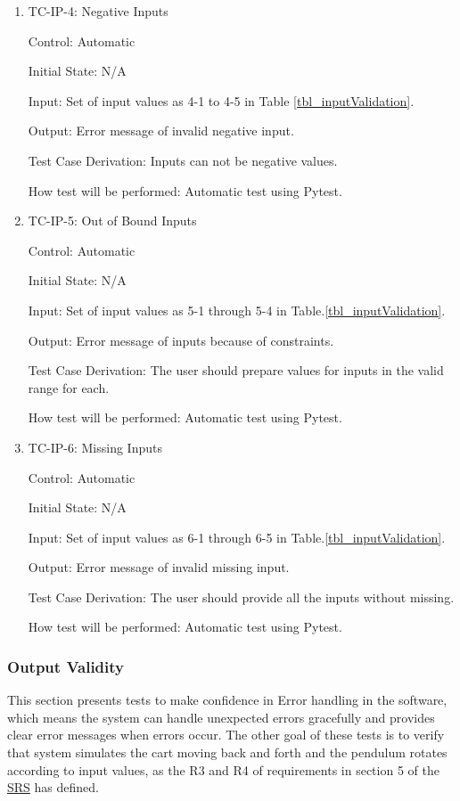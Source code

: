 \documentclass[12pt, titlepage]{article}
\begin{document}
\begin{enumerate}
\item{TC-IP-4: Negative Inputs}

Control: Automatic
					
Initial State: N/A 
					
Input: Set of input values as 4-1 to 4-5 in Table \ref{tbl_inputValidation}.
					
Output: Error message of invalid negative input.

Test Case Derivation: Inputs can not be negative values.
					
How test will be performed: Automatic test using Pytest.

\item{TC-IP-5: Out of Bound Inputs}

Control: Automatic
					
Initial State: N/A 
					
Input: Set of input values as 5-1 through 5-4 in Table.\ref{tbl_inputValidation}.
					
Output: Error message of inputs because of constraints.

Test Case Derivation: The user should prepare values for inputs in the valid range for each.

How test will be performed: Automatic test using Pytest.

\item{TC-IP-6: Missing Inputs}

Control: Automatic
					
Initial State: N/A 
					
Input: Set of input values as 6-1 through 6-5 in Table.\ref{tbl_inputValidation}.
					
Output: Error message of invalid missing input.

Test Case Derivation: The user should provide all the inputs without missing.
					
					
How test will be performed: Automatic test using Pytest.			
				
\end{enumerate}

\subsubsection{Output Validity \label{out_val}}

This section presents tests to make confidence in Error handling in the software, which means the system can handle unexpected errors gracefully and provides clear error messages when errors occur.
The other goal of these tests is to verify that system simulates the cart moving back and forth and the pendulum rotates according to input values, as the R3 and R4 of requirements in section 5 of the  \href{https://github.com/MinMah23/CAS741-Project/tree/main/docs/SRS/SRS.pdf}{SRS} has defined.
\end{document}
